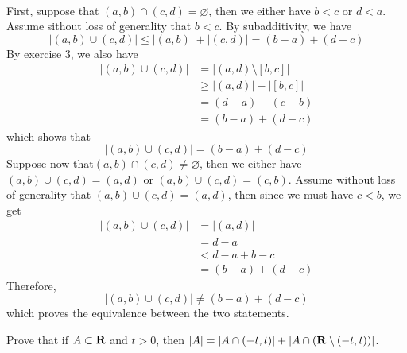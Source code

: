 \begin{solution}
    \\ First, suppose that $(a,b)\cap(c,d) = \varnothing$, then we either have $b < c$ or $d < a$. Assume sithout loss of generality that $b < c$. By subadditivity, we have
    $$|(a,b)\cup(c,d)| \leq |(a,b)|+ |(c,d)| = (b-a) + (d-c)$$
    By exercise 3, we also have
    \begin{align*}
        |(a,b)\cup(c,d)| &= |(a,d) \setminus [b,c]| \\
        &\geq |(a,d)| - |[b,c]| \\
        &= (d - a) - (c - b) \\
        &= (b - a) + (d - c)
    \end{align*}
    which shows that
    $$|(a,b)\cup(c,d)| = (b-a) + (d-c)$$
    Suppose now that$(a,b)\cap(c,d) \neq \varnothing$, then we either have $(a,b)\cup(c,d) = (a,d)$ or $(a,b)\cup(c,d) = (c,b)$. Assume without loss of generality that $(a,b)\cup(c,d) = (a,d)$, then since we must have $c < b$, we get
    \begin{align*}
        |(a,b)\cup(c,d)| &= |(a,d)| \\
        &= d - a \\
        &< d-a + b-c \\
        &= (b-a) + (d - c) 
    \end{align*}
    Therefore, 
    $$|(a,b)\cup(c,d)| \neq (b-a) + (d - c) $$
    which proves the equivalence between the two statements. \\
\end{solution}

\begin{exercise}
    Prove that if $A \subset \mathbf{R}$ and $t > 0$, then $|A| = |A \cap (-t, t)| + |A \cap (\mathbf{R} \setminus (-t, t))|$.\\
\end{exercise}

